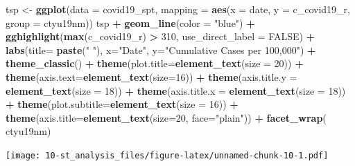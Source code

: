 \documentclass[
]{book}
\newenvironment{Shaded}{\begin{snugshade}}{\end{snugshade}}
\newcommand{\DataTypeTok}[1]{\textcolor[rgb]{0.13,0.29,0.53}{#1}}
\newcommand{\DecValTok}[1]{\textcolor[rgb]{0.00,0.00,0.81}{#1}}
\newcommand{\KeywordTok}[1]{\textcolor[rgb]{0.13,0.29,0.53}{\textbf{#1}}}
\newcommand{\NormalTok}[1]{#1}
\newcommand{\OperatorTok}[1]{\textcolor[rgb]{0.81,0.36,0.00}{\textbf{#1}}}
\newcommand{\OtherTok}[1]{\textcolor[rgb]{0.56,0.35,0.01}{#1}}
\newcommand{\StringTok}[1]{\textcolor[rgb]{0.31,0.60,0.02}{#1}}
\begin{document}
\begin{Shaded}
\begin{Highlighting}[]
\NormalTok{tsp <-}\StringTok{ }\KeywordTok{ggplot}\NormalTok{(}\DataTypeTok{data =}\NormalTok{ covid19_spt,}
            \DataTypeTok{mapping =} \KeywordTok{aes}\NormalTok{(}\DataTypeTok{x =}\NormalTok{ date, }\DataTypeTok{y =}\NormalTok{ c_covid19_r,}
                          \DataTypeTok{group =}\NormalTok{ ctyu19nm))}
\NormalTok{tsp }\OperatorTok{+}\StringTok{ }\KeywordTok{geom_line}\NormalTok{(}\DataTypeTok{color =} \StringTok{"blue"}\NormalTok{) }\OperatorTok{+}\StringTok{ }
\StringTok{    }\KeywordTok{gghighlight}\NormalTok{(}\KeywordTok{max}\NormalTok{(c_covid19_r) }\OperatorTok{>}\StringTok{ }\DecValTok{310}\NormalTok{, }\DataTypeTok{use_direct_label =} \OtherTok{FALSE}\NormalTok{) }\OperatorTok{+}
\StringTok{    }\KeywordTok{labs}\NormalTok{(}\DataTypeTok{title=} \KeywordTok{paste}\NormalTok{(}\StringTok{" "}\NormalTok{), }\DataTypeTok{x=}\StringTok{"Date"}\NormalTok{, }\DataTypeTok{y=}\StringTok{"Cumulative Cases per 100,000"}\NormalTok{) }\OperatorTok{+}
\StringTok{    }\KeywordTok{theme_classic}\NormalTok{() }\OperatorTok{+}
\StringTok{    }\KeywordTok{theme}\NormalTok{(}\DataTypeTok{plot.title=}\KeywordTok{element_text}\NormalTok{(}\DataTypeTok{size =} \DecValTok{20}\NormalTok{)) }\OperatorTok{+}
\StringTok{    }\KeywordTok{theme}\NormalTok{(}\DataTypeTok{axis.text=}\KeywordTok{element_text}\NormalTok{(}\DataTypeTok{size=}\DecValTok{16}\NormalTok{)) }\OperatorTok{+}
\StringTok{    }\KeywordTok{theme}\NormalTok{(}\DataTypeTok{axis.title.y =} \KeywordTok{element_text}\NormalTok{(}\DataTypeTok{size =} \DecValTok{18}\NormalTok{)) }\OperatorTok{+}
\StringTok{    }\KeywordTok{theme}\NormalTok{(}\DataTypeTok{axis.title.x =} \KeywordTok{element_text}\NormalTok{(}\DataTypeTok{size =} \DecValTok{18}\NormalTok{)) }\OperatorTok{+}
\StringTok{    }\KeywordTok{theme}\NormalTok{(}\DataTypeTok{plot.subtitle=}\KeywordTok{element_text}\NormalTok{(}\DataTypeTok{size =} \DecValTok{16}\NormalTok{)) }\OperatorTok{+}
\StringTok{    }\KeywordTok{theme}\NormalTok{(}\DataTypeTok{axis.title=}\KeywordTok{element_text}\NormalTok{(}\DataTypeTok{size=}\DecValTok{20}\NormalTok{, }\DataTypeTok{face=}\StringTok{"plain"}\NormalTok{)) }\OperatorTok{+}
\StringTok{    }\KeywordTok{facet_wrap}\NormalTok{(}\OperatorTok{~}\StringTok{ }\NormalTok{ctyu19nm)}
\end{Highlighting}
\end{Shaded}

\texttt{[image: 10-st\_analysis\_files/figure-latex/unnamed-chunk-10-1.pdf]}
\end{document}
